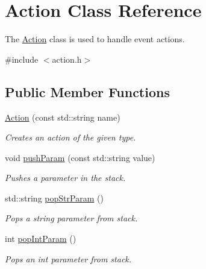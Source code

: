 \hypertarget{classAction}{
\section{Action Class Reference}
\label{classAction}
}


The \hyperlink{classAction}{Action} class is used to handle event actions.  




{\ttfamily \#include $<$action.h$>$}

\subsection*{Public Member Functions}
\begin{DoxyCompactItemize}
\item 
\hypertarget{classAction_a30a8c6d718ce3d774733726acc6fedef}{
\hyperlink{classAction_a30a8c6d718ce3d774733726acc6fedef}{Action} (const std::string name)}
\label{classAction_a30a8c6d718ce3d774733726acc6fedef}

\begin{DoxyCompactList}\small\item\em Creates an action of the given type. \item\end{DoxyCompactList}\item 
\hypertarget{classAction_ad4aea9499372a6d77fed4eaa4078832c}{
void \hyperlink{classAction_ad4aea9499372a6d77fed4eaa4078832c}{pushParam} (const std::string value)}
\label{classAction_ad4aea9499372a6d77fed4eaa4078832c}

\begin{DoxyCompactList}\small\item\em Pushes a parameter in the stack. \item\end{DoxyCompactList}\item 
\hypertarget{classAction_acfec989e31adf81aac23ed3553a6bb1d}{
std::string \hyperlink{classAction_acfec989e31adf81aac23ed3553a6bb1d}{popStrParam} ()}
\label{classAction_acfec989e31adf81aac23ed3553a6bb1d}

\begin{DoxyCompactList}\small\item\em Pops a string parameter from stack. \item\end{DoxyCompactList}\item 
\hypertarget{classAction_aa00c16bc5c78b003a749032650242e41}{
int \hyperlink{classAction_aa00c16bc5c78b003a749032650242e41}{popIntParam} ()}
\label{classAction_aa00c16bc5c78b003a749032650242e41}

\begin{DoxyCompactList}\small\item\em Pops an int parameter from stack. \item\end{DoxyCompactList}\end{DoxyCompactItemize}
